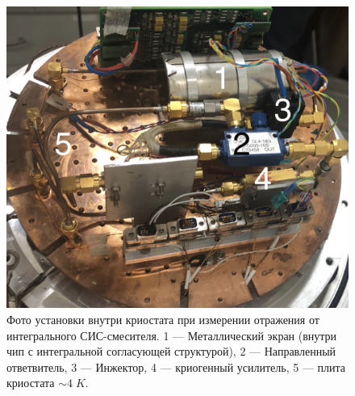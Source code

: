 \documentclass[a4paper]{article}
\begin{document}
\begin{figure}[H]
    \begin{center}
        \includegraphics[scale=0.1]{exp_photo1.jpg}
        \caption{Фото установки внутри криостата при измерении отражения от интегрального СИС-смесителя. 1 — Металлический экран (внутри чип с интегральной согласующей структурой), 2 — Направленный ответвитель, 3 — Инжектор, 4 — криогенный усилитель, 5 — плита криостата $\sim 4\; K$.}
        \label{fig:exp_photo1}
    \end{center}
\end{figure}
\end{document}
